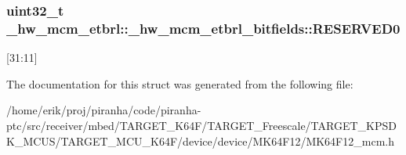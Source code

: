 \subsubsection[{\texorpdfstring{R\+E\+S\+E\+R\+V\+E\+D0}{RESERVED0}}]{\setlength{\rightskip}{0pt plus 5cm}uint32\+\_\+t \+\_\+hw\+\_\+mcm\+\_\+etbrl\+::\+\_\+hw\+\_\+mcm\+\_\+etbrl\+\_\+bitfields\+::\+R\+E\+S\+E\+R\+V\+E\+D0}\hypertarget{struct__hw__mcm__etbrl_1_1__hw__mcm__etbrl__bitfields_a6d8b6310a3cc785519ee8eccc3790cc4}{}\label{struct__hw__mcm__etbrl_1_1__hw__mcm__etbrl__bitfields_a6d8b6310a3cc785519ee8eccc3790cc4}
\mbox{[}31\+:11\mbox{]} 

The documentation for this struct was generated from the following file\+:\begin{DoxyCompactItemize}
\item 
/home/erik/proj/piranha/code/piranha-\/ptc/src/receiver/mbed/\+T\+A\+R\+G\+E\+T\+\_\+\+K64\+F/\+T\+A\+R\+G\+E\+T\+\_\+\+Freescale/\+T\+A\+R\+G\+E\+T\+\_\+\+K\+P\+S\+D\+K\+\_\+\+M\+C\+U\+S/\+T\+A\+R\+G\+E\+T\+\_\+\+M\+C\+U\+\_\+\+K64\+F/device/device/\+M\+K64\+F12/M\+K64\+F12\+\_\+mcm.\+h\end{DoxyCompactItemize}
